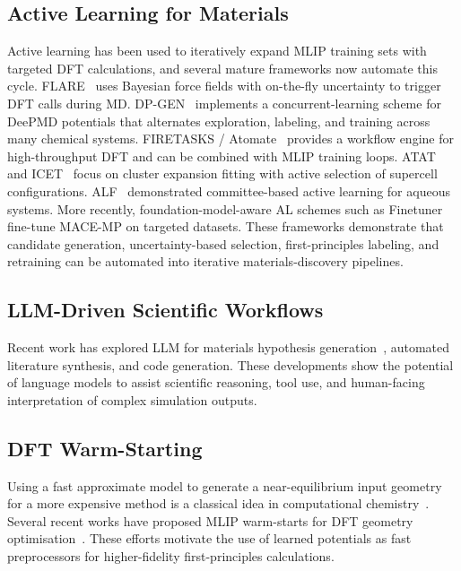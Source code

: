 \documentclass[conference]{IEEEtran}
\def\acs#1{#1}%
\def\acp#1{#1}%
\begin{document}
\subsection{Active Learning for Materials}
Active learning has been used to iteratively expand \acs{MLIP} training sets with
targeted \acs{DFT} calculations, and several mature frameworks now automate this
cycle. FLARE~\cite{vandermause2020,vandermause2022} uses Bayesian force fields
with on-the-fly uncertainty to trigger \acs{DFT} calls during \acs{MD}.
DP-GEN~\cite{zhang2020dpgen} implements a concurrent-learning scheme for
DeePMD potentials that alternates exploration, labeling, and training across
many chemical systems. FIRETASKS / Atomate~\cite{mathew2017atomate} provides
a workflow engine for high-throughput \acs{DFT} and can be combined with \acs{MLIP}
training loops. ATAT and ICET~\cite{icet2019} focus on cluster expansion
fitting with active selection of supercell configurations.
ALF~\cite{schran2020} demonstrated committee-based active learning for
aqueous systems. More recently, foundation-model-aware AL schemes such as
Finetuner~\cite{batatia2023macemp} fine-tune MACE-MP on targeted datasets.
These frameworks demonstrate that candidate generation, uncertainty-based
selection, first-principles labeling, and retraining can be automated into
iterative materials-discovery pipelines.

\subsection{LLM-Driven Scientific Workflows}
Recent work has explored \acp{LLM} for materials hypothesis generation~\cite{
merchant2023,xie2023,sprueill2023}, automated literature synthesis, and code
generation. These developments show the potential of language models to assist
scientific reasoning, tool use, and human-facing interpretation of complex
simulation outputs.

\subsection{DFT Warm-Starting}
Using a fast approximate model to generate a near-equilibrium input geometry
for a more expensive method is a classical idea in computational
chemistry~\cite{lejaeghere2016}. Several recent works have proposed \acs{MLIP}
warm-starts for \acs{DFT} geometry optimisation~\cite{schreiner2022,merchant2023}.
These efforts motivate the use of learned potentials as fast preprocessors for
higher-fidelity first-principles calculations.
\end{document}
